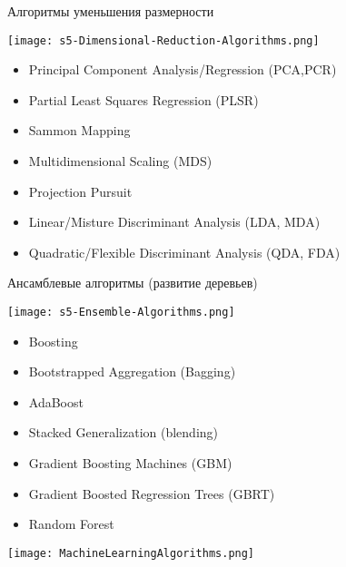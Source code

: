 \documentclass[pdf, intlimits, 9pt, unicode]{beamer}
\begin{document}
\begin{frame}{Алгоритмы уменьшения размерности}

\begin{center}\texttt{[image: s5-Dimensional-Reduction-Algorithms.png]}\end{center}

\begin{itemize}
\item Principal Component Analysis/Regression (PCA,PCR)
\item Partial Least Squares Regression (PLSR)
\item Sammon Mapping
\item Multidimensional Scaling (MDS)
\item Projection Pursuit
\item Linear/Misture Discriminant Analysis (LDA, MDA)
\item Quadratic/Flexible Discriminant Analysis (QDA, FDA)
\end{itemize}

\end{frame}






\begin{frame}{Ансамблевые алгоритмы (развитие деревьев)}

\begin{center}\texttt{[image: s5-Ensemble-Algorithms.png]}\end{center}

\begin{itemize}
\item Boosting
\item Bootstrapped Aggregation (Bagging)
\item AdaBoost
\item Stacked Generalization (blending)
\item Gradient Boosting Machines (GBM)
\item Gradient Boosted Regression Trees (GBRT)
\item {\color{red}Random Forest}
\end{itemize}

\end{frame}





\begin{frame}
\begin{center}\texttt{[image: MachineLearningAlgorithms.png]}\end{center}
\end{frame}
\end{document}
